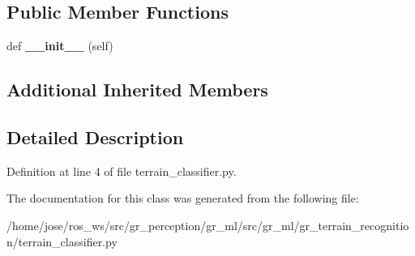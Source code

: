 \subsection*{Public Member Functions}
\begin{DoxyCompactItemize}
\item 
\mbox{\label{classgr__ml_1_1gr__terrain__recognition_1_1terrain__classifier_1_1TerrainClassifier_a12a3eec701ac8403b9b6824513192ce2}} 
def {\bfseries \+\_\+\+\_\+init\+\_\+\+\_\+} (self)
\end{DoxyCompactItemize}
\subsection*{Additional Inherited Members}


\subsection{Detailed Description}


Definition at line 4 of file terrain\+\_\+classifier.\+py.



The documentation for this class was generated from the following file\+:\begin{DoxyCompactItemize}
\item 
/home/jose/ros\+\_\+ws/src/gr\+\_\+perception/gr\+\_\+ml/src/gr\+\_\+ml/gr\+\_\+terrain\+\_\+recognition/terrain\+\_\+classifier.\+py\end{DoxyCompactItemize}
